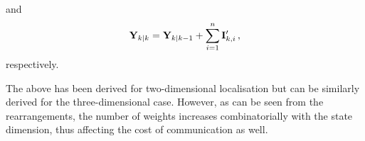 and
\begin{equation}\label{eq:nonlin_fusion:eif_modified_mat_update}
    {\ensuremath{{\mathbf{Y}}}}_{k|k} = {{\mathbf{Y}}}_{k|k-1} + \sum^n_{i=1}{{\mathbf{I}}}'_{k,i}\,,
\end{equation}
respectively.
\begin{remark}
    The above has been derived for two-dimensional localisation but can be similarly derived for the three-dimensional case. However, as can be seen from the rearrangements, the number of weights increases combinatorially with the state dimension, thus affecting the cost of communication as well.
\end{remark}

% 
% 

